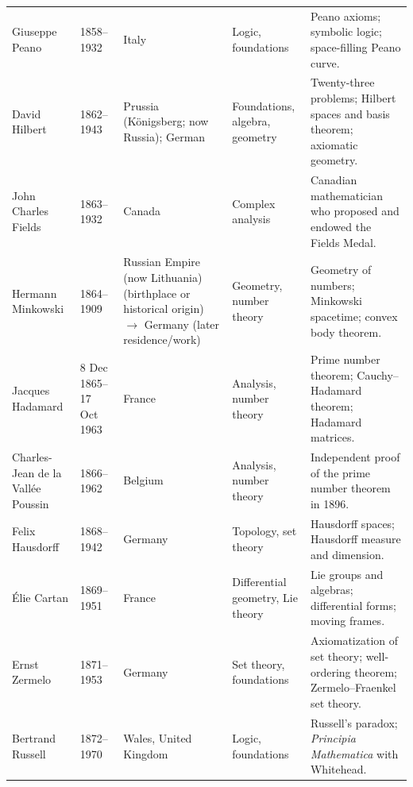 {\begin{longtable}{@{}L{0.145\textwidth}L{0.09\textwidth}L{0.225\textwidth}L{0.14\textwidth}L{0.30\textwidth}@{}}
        Giuseppe Peano
        & 1858--1932
        & Italy
        & Logic, foundations
        & Peano axioms; symbolic logic; space-filling Peano curve. \\

        David Hilbert
        & 1862--1943
        & Prussia (Königsberg; now Russia); German
        & Foundations, algebra, geometry
        & Twenty-three problems; Hilbert spaces and basis theorem; axiomatic
          geometry. \\

        John Charles Fields
        & 1863--1932
        & Canada
        & Complex analysis
        & Canadian mathematician who proposed and endowed the Fields Medal. \\

        Hermann Minkowski
        & 1864--1909
        & Russian Empire (now Lithuania) (birthplace or historical origin) \(\to\) Germany (later residence/work)
        & Geometry, number theory
        & Geometry of numbers; Minkowski spacetime; convex body theorem. \\

        Jacques Hadamard
        & 8 Dec 1865--17 Oct 1963
        & France
        & Analysis, number theory
        & Prime number theorem; Cauchy--Hadamard theorem; Hadamard matrices. \\

        Charles-Jean de la Vallée Poussin
        & 1866--1962
        & Belgium
        & Analysis, number theory
        & Independent proof of the prime number theorem in 1896. \\

        Felix Hausdorff
        & 1868--1942
        & Germany
        & Topology, set theory
        & Hausdorff spaces; Hausdorff measure and dimension. \\

        Élie Cartan
        & 1869--1951
        & France
        & Differential geometry, Lie theory
        & Lie groups and algebras; differential forms; moving frames. \\

        Ernst Zermelo
        & 1871--1953
        & Germany
        & Set theory, foundations
        & Axiomatization of set theory; well-ordering theorem; Zermelo--Fraenkel
          set theory. \\

        Bertrand Russell
        & 1872--1970
        & Wales, United Kingdom
        & Logic, foundations
        & Russell's paradox; \textit{Principia Mathematica} with Whitehead. \\


\end{longtable}}
